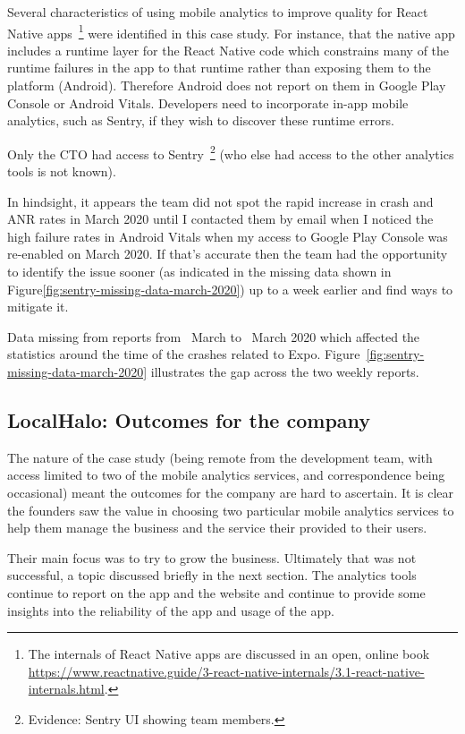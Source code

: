 Several characteristics of using mobile analytics to improve quality for React Native apps~\footnote{The internals of React Native apps are discussed in an open, online book \url{https://www.reactnative.guide/3-react-native-internals/3.1-react-native-internals.html}.} 
were identified in this case study. For instance, that the native app includes a runtime layer for the React Native code which constrains many of the runtime failures in the app to that runtime rather than exposing them to the platform (Android). Therefore Android does not report on them in Google Play Console or Android Vitals. Developers need to incorporate in-app mobile analytics, such as Sentry, if they wish to discover these runtime errors.

Only the CTO had access to Sentry~\footnote{Evidence: Sentry UI showing team members.} (who else had access to the other analytics tools is not known).

In hindsight, it appears the team did not spot the rapid increase in crash and ANR rates in March 2020 until I contacted them by email when I noticed the high failure rates in Android Vitals when my access to Google Play Console was re-enabled on  March 2020. If that's accurate then the team had the opportunity to identify the issue sooner (as indicated in the missing data shown in Figure\ref{fig:sentry-missing-data-march-2020}) up to a week earlier and find ways to mitigate it. 

Data missing from reports from~ March to~ March 2020 which affected the statistics around the time of the crashes related to Expo. Figure~\ref{fig:sentry-missing-data-march-2020} illustrates the gap across the two weekly reports. 


\subsection{LocalHalo: Outcomes for the company}
The nature of the case study (being remote from the development team, with access limited to two of the mobile analytics services, and correspondence being occasional) meant the outcomes for the company are hard to ascertain. It is clear the founders saw the value in choosing two particular mobile analytics services to help them manage the business and the service their provided to their users. 

Their main focus was to try to grow the business. Ultimately that was not successful, a topic discussed briefly in the next section. The analytics tools continue to report on the app and the website and continue to provide some insights into the reliability of the app and usage of the app.


